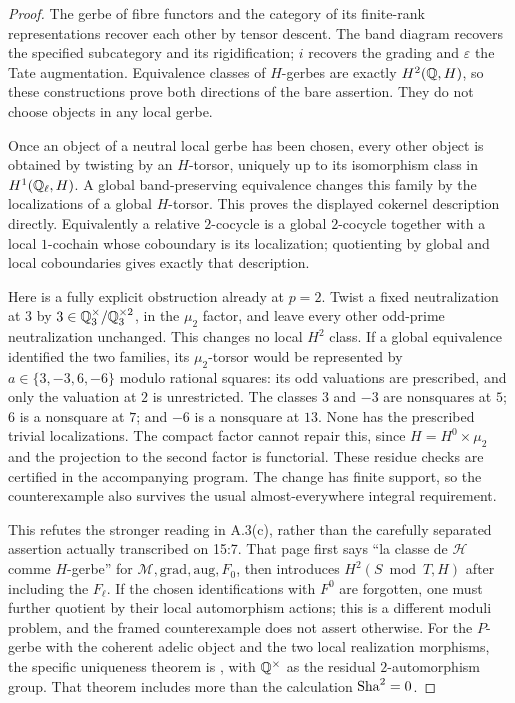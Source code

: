 \begin{proof}
The gerbe of fibre functors and the category of its finite-rank
representations recover each other by tensor descent. The band
diagram recovers the specified subcategory and its rigidification;
$i$ recovers the grading and $\varepsilon$ the Tate augmentation.
Equivalence classes of $H$-gerbes are exactly $H^2(\mathbb Q,H)$, so
these constructions prove both directions of the bare assertion.
They do not choose objects in any local gerbe.

Once an object of a neutral local gerbe has been chosen, every
other object is obtained by twisting by an $H$-torsor, uniquely
up to its isomorphism class in $H^1(\mathbb Q_\ell,H)$. A global
band-preserving equivalence changes this family by the
localizations of a global $H$-torsor. This proves the displayed
cokernel description directly. Equivalently a relative
$2$-cocycle is a global $2$-cocycle together with a local
$1$-cochain whose coboundary is its localization; quotienting
by global and local coboundaries gives exactly that description.

Here is a fully explicit obstruction already at $p=2$. Twist a
fixed neutralization at $3$ by $3\in\mathbb Q_3^\times/\mathbb Q_3^{\times2}$,
in the $\mu_2$ factor, and leave every other odd-prime
neutralization unchanged. This changes no local $H^2$ class.
If a global equivalence identified the two families, its
$\mu_2$-torsor would be represented by
$a\in\{3,-3,6,-6\}$ modulo rational squares: its odd
valuations are prescribed, and only the valuation at $2$ is
unrestricted. The classes $3$ and $-3$ are nonsquares at $5$;
$6$ is a nonsquare at $7$; and $-6$ is a nonsquare at $13$.
None has the prescribed trivial localizations. The compact
factor cannot repair this, since $H=H^0\times\mu_2$ and the
projection to the second factor is functorial. These residue
checks are certified in the accompanying program. The change
has finite support, so the counterexample also survives the
usual almost-everywhere integral requirement.

This refutes the stronger reading in A.3(c), rather than the
carefully separated assertion actually transcribed on 15:7.
That page first says ``la classe de $\mathcal H$ comme
$H$-gerbe'' for $\mathcal M,\mathrm{grad},\mathrm{aug},F_0$,
then introduces $H^2(S\bmod T,H)$ after including the $F_\ell$.
If the chosen identifications with $F^0$ are forgotten, one
must further quotient by their local automorphism actions; this
is a different moduli problem, and the framed counterexample
does not assert otherwise. For the $P$-gerbe with the coherent
adelic object and the two local realization morphisms, the
specific uniqueness theorem is \citet[Theorem 6.3]{AMilne2003},
with $\mathbb Q^\times$ as the residual $2$-automorphism group.
That theorem includes more than the calculation $\mathop{\mathrm{Sha}}^2=0$.
\end{proof}

